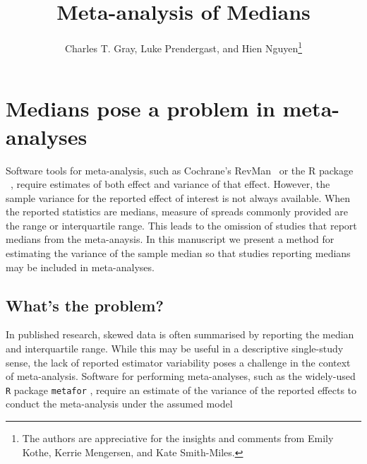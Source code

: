 \documentclass{article}
\title{Meta-analysis of Medians}
\author{Charles T. Gray, Luke Prendergast, and Hien Nguyen\thanks{
The authors are appreciative for the insights and comments from Emily Kothe, Kerrie Mengersen, and Kate Smith-Miles.
}}
\begin{document}
\maketitle


\begin{abstract}
\end{abstract}


\section{Medians pose a problem in meta-analyses}

Software tools for meta-analysis, such as Cochrane's
RevMan~
or the R package ~,
require estimates of both effect and variance
of that effect. However, the sample variance for the reported effect of interest is not always available.
When the reported statistics are medians, measure of spreads commonly provided
are the range or interquartile range. This leads to the omission of studies that report medians from the meta-anaysis. In this manuscript we present a method for estimating the variance of the sample median so that studies reporting medians may be included in meta-analyses.



\subsection{What's the problem?}

In published research, skewed data is often summarised by reporting the median and interquartile range. While this may be useful in a descriptive single-study sense, the lack of reported estimator variability poses a challenge in the context of meta-analysis.  Software for performing meta-analyses, such as the widely-used \texttt{R} package \texttt{metafor} \cite{Metafor2010}, require an estimate of the variance of the reported effects to conduct the meta-analysis under the assumed model
\end{document}
